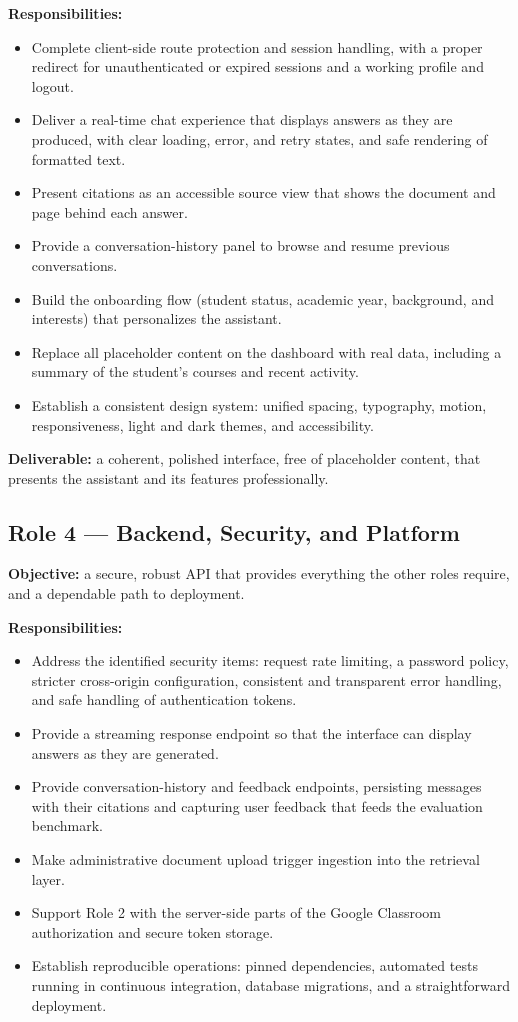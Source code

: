 \documentclass[11pt,a4paper]{article}
\begin{document}
\textbf{Responsibilities:}
\begin{itemize}
  \item Complete client-side route protection and session handling, with a proper
        redirect for unauthenticated or expired sessions and a working profile and
        logout.
  \item Deliver a real-time chat experience that displays answers as they are produced,
        with clear loading, error, and retry states, and safe rendering of formatted
        text.
  \item Present citations as an accessible source view that shows the document and page
        behind each answer.
  \item Provide a conversation-history panel to browse and resume previous
        conversations.
  \item Build the onboarding flow (student status, academic year, background, and
        interests) that personalizes the assistant.
  \item Replace all placeholder content on the dashboard with real data, including a
        summary of the student's courses and recent activity.
  \item Establish a consistent design system: unified spacing, typography, motion,
        responsiveness, light and dark themes, and accessibility.
\end{itemize}

\textbf{Deliverable:} a coherent, polished interface, free of placeholder content,
that presents the assistant and its features professionally.

\subsection{Role 4 --- Backend, Security, and Platform}
\textbf{Objective:} a secure, robust API that provides everything the other roles
require, and a dependable path to deployment.

\textbf{Responsibilities:}
\begin{itemize}
  \item Address the identified security items: request rate limiting, a password
        policy, stricter cross-origin configuration, consistent and transparent error
        handling, and safe handling of authentication tokens.
  \item Provide a streaming response endpoint so that the interface can display answers
        as they are generated.
  \item Provide conversation-history and feedback endpoints, persisting messages with
        their citations and capturing user feedback that feeds the evaluation benchmark.
  \item Make administrative document upload trigger ingestion into the retrieval layer.
  \item Support Role 2 with the server-side parts of the Google Classroom
        authorization and secure token storage.
  \item Establish reproducible operations: pinned dependencies, automated tests running
        in continuous integration, database migrations, and a straightforward
        deployment.
\end{itemize}
\end{document}
